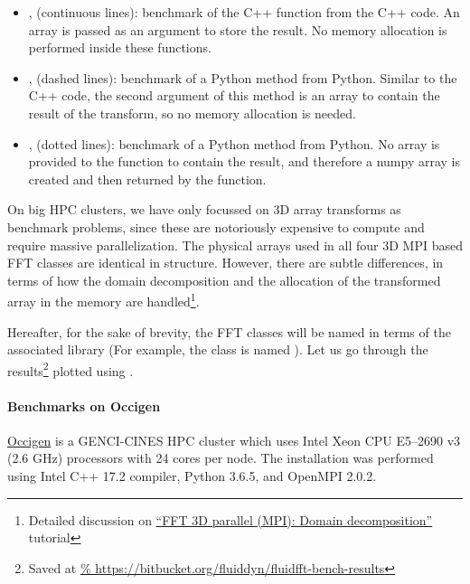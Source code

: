 \begin{itemize}

\item {},  (continuous lines): benchmark
of the C++ function from the C++ code. An array is passed as an argument to store
the result. No memory allocation is performed inside these functions.

\item {},  (dashed lines):
benchmark of a Python method from Python. Similar to the C++ code, the second
argument of this method is an array to contain the result of the transform, so no
memory allocation is needed.

\item {},  (dotted lines):
benchmark of a Python method from Python. No array is provided to the function to
contain the result, and therefore a numpy array is created and then returned by
the function.

\end{itemize}

On big HPC clusters, we have only focussed on 3D array transforms as benchmark
problems, since these are notoriously expensive to compute and require massive
parallelization.  The physical arrays used in all four 3D MPI based FFT classes
are identical in structure.  However, there are subtle differences, in terms of
how the domain decomposition and the allocation of the transformed array in the
memory are handled\footnote{Detailed discussion on \href{%
https://fluidfft.readthedocs.io/en/latest/ipynb/executed/tuto_fft3d_mpi_domain_decomp.html}{%
``FFT 3D parallel (MPI): Domain decomposition''} tutorial}.

Hereafter, for the sake of brevity, the FFT classes will be named in terms of the
associated library (For example, the class  is
named ).  Let us go through the results\footnote{Saved at
\url{%
https://bitbucket.org/fluiddyn/fluidfft-bench-results}} plotted using
.

\paragraph{Benchmarks on Occigen}

\href{https://www.top500.org/system/178465}{Occigen} is a GENCI-CINES HPC
cluster which uses Intel Xeon CPU E5--2690 v3 (2.6 GHz) processors with 24 cores
per node. The installation was performed using Intel C++ 17.2 compiler, Python
3.6.5, and OpenMPI 2.0.2.


